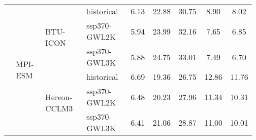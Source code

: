 \begin{table}[!htbp]
{\begin{tabular}{lll|l|c|c|c|c|c}
\cmidrule(lr){3-9}
\cmidrule(lr){2-9}
 & \multirow{6}{*}{MPI-ESM} & \multirow{3}{*}{BTU-ICON} & historical & 6.13 & 22.88 & 30.75 & 8.90 & 8.02 \\
 &  &  & ssp370-GWL2K & 5.94 & 23.99 & 32.16 & 7.65 & 6.85 \\
 &  &  & ssp370-GWL3K & 5.88 & 24.75 & 33.01 & 7.49 & 6.70 \\
\cmidrule(lr){3-9}
 &  & \multirow{3}{*}{Hereon-CCLM3} & historical & 6.69 & 19.36 & 26.75 & 12.86 & 11.76 \\
 &  &  & ssp370-GWL2K & 6.48 & 20.23 & 27.96 & 11.34 & 10.31 \\
 &  &  & ssp370-GWL3K & 6.41 & 21.06 & 28.87 & 11.00 & 10.01 \\
\bottomrule
\end{tabular}
}
\end{table}
